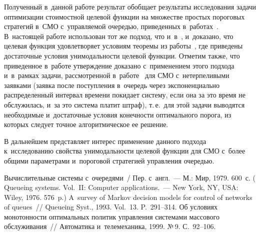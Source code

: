 \begin{multicols}{2}
Полученный в~данной работе результат обобщает результаты исследования
задачи оптимизации стоимостной целевой функции на множестве прос\-тых
пороговых стратегий в~СМО с~управ\-ля\-емой очередью, приведенных
в~работах~\cite{11-ag, 12-ag}. В~настоящей работе использован тот же подход,
что и~в~\cite{11-ag, 12-ag}, и~доказано, что целевая функция удовле\-тво\-ря\-ет
условиям теоремы из работы~\cite{13-ag}, где приведены достаточные условия
унимодальности целевой функции. Отметим также, что приведенное в~работе
утверждение доказано с~применением этого подхода и~в~рамках задачи,
рассмотренной в~работе~\cite{9-ag} для СМО с~нетерпеливыми заявками
(заявка после поступления в~очередь через экспоненциально распределенный
интервал времени покидает систему, если она за это время не обслужилась,
и~за это система платит штраф), т.\,е.\ для этой задачи выводятся необходимые
и~достаточные условия конечности оптимального порога, из которых следует
точное алгоритмическое ее решение.

В дальнейшем представляет интерес применение данного подхода
к~исследованию свойства унимодальности целевой функции для СМО с~более\linebreak
общими параметрами и~пороговой стратегией управ\-ле\-ния очередью.


{\small\frenchspacing
{%
\begin{thebibliography}{99}


 Вычислительные системы с~очередями~/ Пер. с~англ.~--- М.:
Мир, 1979. 600~с. ( Queueing systems. Vol.~II: Computer
applications.~--- New York, NY, USA: Wiley, 1976. 576~p.)
 A~survey of Markov decision models for control of
networks of queues~// Queueing Syst., 1993. Vol.~13. P.~291--314.
 Об условиях монотонности оптимальных политик управления
системами массового обслуживания~// Автоматика и~телемеханика, 1999. №\,9.
С.~92--106.



\end{thebibliography}}}
\end{multicols}
